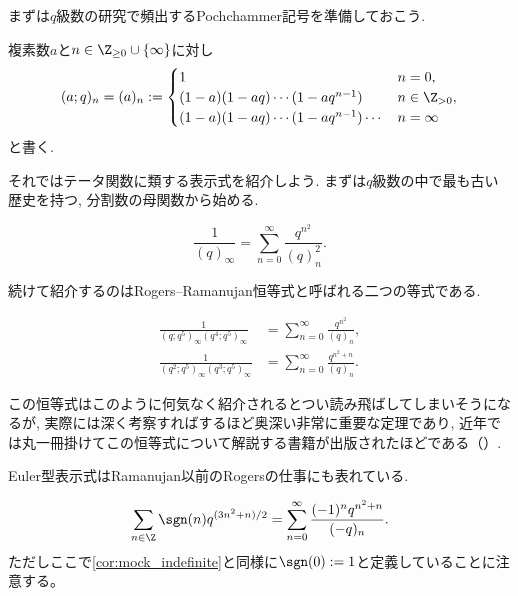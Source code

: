 \documentclass[11pt,b5paper,oneside,lualatex]{ltjsarticle} %
\numberwithin{equation}{section} %
\begin{document}
まずは$ q $級数の研究で頻出するPochchammer記号を準備しておこう. 

\begin{dfn}[Pochhammer記号]
	複素数$ a $と$ n \in \Z_{\ge 0} \cup \{ \infty \} $に対し
	\[
	(a; q)_n = (a)_n :=
	\begin{cases}
		1 & n=0, \\
		(1 - a) (1 - aq) \cdots (1 - aq^{n-1}) & n \in \Z_{>0}, \\
		(1 - a) (1 - aq) \cdots (1 - aq^{n-1}) \cdots & n = \infty
	\end{cases}
	\]
	と書く. 
\end{dfn}

それではテータ関数に類する表示式を紹介しよう. 
まずは$ q $級数の中で最も古い歴史を持つ, 分割数の母関数から始める. 

\begin{thm}
	\label{thm:Jacobi}
	\[
	\frac{1}{(q)_\infty} = \sum_{n=0}^{\infty} \frac{q^{n^2}}{(q)_n^2}.
	\]
\end{thm}

続けて紹介するのはRogers--Ramanujan恒等式と呼ばれる二つの等式である. 

\begin{thm}
	\begin{align}
		\frac{1}{(q; q^5)_\infty (q^4; q^5)_\infty} 
		&=
		\sum_{n=0}^{\infty} \frac{q^{n^2}}{(q)_n},
		\\
		\frac{1}{(q^2; q^5)_\infty (q^3; q^5)_\infty} 
		&=
		\sum_{n=0}^{\infty} \frac{q^{n^2 + n}}{(q)_n}.
	\end{align}
\end{thm}

この恒等式はこのように何気なく紹介されるとつい読み飛ばしてしまいそうになるが, 実際には深く考察すればするほど奥深い非常に重要な定理であり, 近年では丸一冊掛けてこの恒等式について解説する書籍が出版されたほどである（\cite{魅惑}）. 

Euler型表示式はRamanujan以前のRogersの仕事にも表れている. 

\begin{thm}
	\begin{align}	
		\sum_{n \in \Z} \sgn(n) q^{(3n^2 + n)/2}
		=
		\sum_{n=0}^{\infty} \frac{(-1)^n q^{n^2 + n}}{(-q)_n}.
	\end{align}
	ただしここで\cref{cor:mock_indefinite}と同様に$ \sgn(0) := 1 $と定義していることに注意する。
\end{thm}
\end{document}
